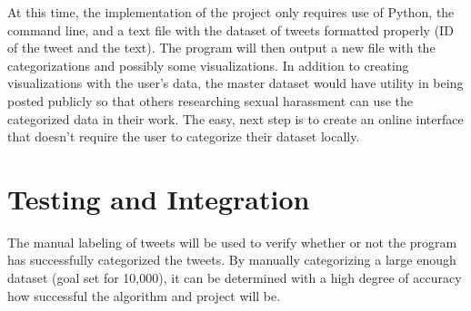 At this time, the implementation of the project only requires use of Python, the command line, and a text file with the dataset of tweets formatted properly (ID of the tweet and the text). The program will then output a new file with the categorizations and possibly some visualizations. In addition to creating visualizations with the user’s data, the master dataset would have utility in being posted publicly so that others researching sexual harassment can use the categorized data in their work. The easy, next step is to create an online interface that doesn’t require the user to categorize their dataset locally.

\section{Testing and Integration}

The manual labeling of tweets will be used to verify whether or not the program has successfully categorized the tweets. By manually categorizing a large enough dataset (goal set for 10,000), it can be determined with a high degree of accuracy how successful the algorithm and project will be. 
